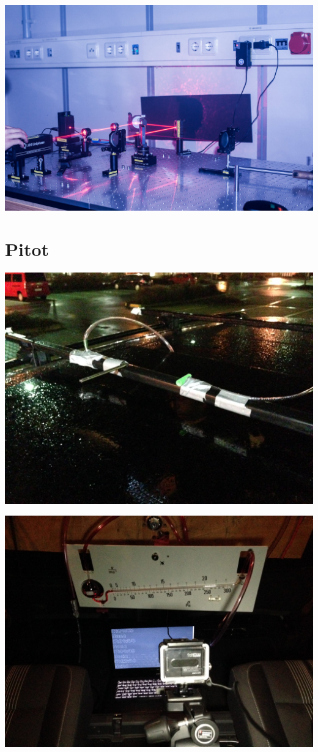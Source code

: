 \documentclass[11pt]{beamer}
\begin{document}
\begin{frame}
	\includegraphics[width=\textwidth]{images/2/interferrometer-6}
\end{frame}

\section{Pitot}
\begin{frame}
	\includegraphics[width=\textwidth]{images/3/IMG_0004}
\end{frame}
\begin{frame}
	\includegraphics[width=\textwidth]{images/3/IMG_0007}
\end{frame}
\end{document}
